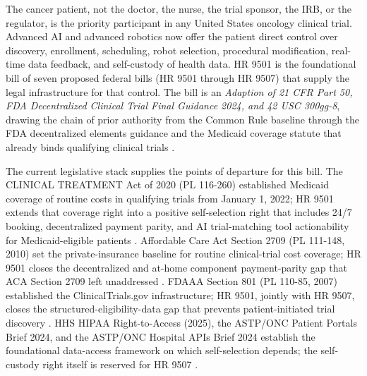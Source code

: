 %

The cancer patient, not the doctor, the nurse, the trial sponsor, the
IRB, or the regulator, is the priority participant in any United
States oncology clinical trial. Advanced AI and advanced robotics now
offer the patient direct control over discovery, enrollment,
scheduling, robot selection, procedural modification, real-time data
feedback, and self-custody of health data. HR 9501 is the foundational
bill of seven proposed federal bills (HR 9501 through HR 9507) that
supply the legal infrastructure for that control. The bill is an
\textit{Adaption of 21 CFR Part 50, FDA Decentralized Clinical Trial
Final Guidance 2024, and 42 USC 300gg-8}, drawing the chain of prior
authority from the Common Rule baseline through the FDA decentralized
elements guidance and the Medicaid coverage statute that already binds
qualifying clinical trials \cite{hhs_45cfr46_protection_human_subjects,
fda_dct_guidance_2024, fda_oce_advancing_oncology_dct_2024,
usc_300gg8_clinical_trials, kawchak_2026_19994945,
kawchak_2026_19119939, kawchak_2026_20045457}.

The current legislative stack supplies the points of departure for
this bill. The CLINICAL TREATMENT Act of 2020 (PL 116-260) established
Medicaid coverage of routine costs in qualifying trials from January
1, 2022; HR 9501 extends that coverage right into a positive
self-selection right that includes 24/7 booking, decentralized payment
parity, and AI trial-matching tool actionability for Medicaid-eligible
patients \cite{rank2_clinical_treatment_act_2020, jin2024trialgpt,
gupta2024prism, abdallah2026trialmatchai}. Affordable Care Act Section
2709 (PL 111-148, 2010) set the private-insurance baseline for routine
clinical-trial cost coverage; HR 9501 closes the decentralized and
at-home component payment-parity gap that ACA Section 2709 left
unaddressed \cite{rank3_aca_clinical_trials_2010,
usc_300gg8_clinical_trials}. FDAAA Section 801 (PL 110-85, 2007)
established the ClinicalTrials.gov infrastructure; HR 9501, jointly
with HR 9507, closes the structured-eligibility-data gap that prevents
patient-initiated trial discovery \cite{rank5_fdaaa_2007}. HHS HIPAA
Right-to-Access (2025), the ASTP/ONC Patient Portals Brief 2024, and
the ASTP/ONC Hospital APIs Brief 2024 establish the foundational
data-access framework on which self-selection depends; the self-
custody right itself is reserved for HR 9507
\cite{hhs_right_to_access_2025, astp_onc_patient_portals_apps_2024,
astp_onc_hospital_apis_2024}.

